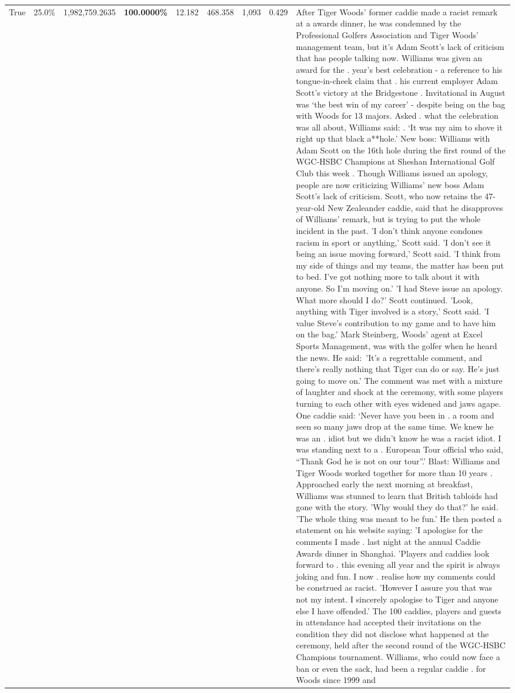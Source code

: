 \begin{table}[H]
\begin{tabular}{lllrlllll}
True & 25.0\% & 1,982,759.2635 & \bfseries \color{red} 100.0000\% & 12.182 & 468.358 & 1,093 & 0.429 & After Tiger Woods' former caddie made a racist remark at a awards dinner, he was condemned by the Professional Golfers Association and Tiger Woods' management team, but it's Adam Scott's lack of criticism that has people talking now. Williams was given an award for the . year’s best celebration - a reference to his tongue-in-cheek claim that . his current employer Adam Scott’s victory at the Bridgestone . Invitational in August was ‘the best win of my career’ - despite being on the bag with Woods for 13 majors. Asked . what the celebration was all about, Williams said: . ‘It was my aim to shove it right up that black a**hole.’ New boss: Williams with Adam Scott  on the 16th hole during the first round of the WGC-HSBC Champions at Sheshan International Golf Club this week . Though Williams issued an apology, people are now criticizing Williams' new boss Adam Scott's lack of criticism. Scott, who now retains the 47-year-old New Zealeander caddie, said that he disapproves of Williams' remark, but is trying to put the whole incident in the past. 'I don't think anyone condones racism in sport or anything,' Scott said. 'I don't see it being an issue moving forward,' Scott said. 'I think from my side of things and my teams, the matter has been put to bed. I've got nothing more to talk about it with anyone. So I'm moving on.' 'I had Steve issue an apology. What more should I do?' Scott continued. 'Look, anything with Tiger involved is a story,' Scott said. 'I value Steve's contribution to my game and to have him on the bag.' Mark Steinberg, Woods' agent at Excel Sports Management, was with the golfer when he heard the news. He said: 'It's a regrettable comment, and there's really nothing that Tiger can do or say. He's just going to move on.' The comment was met with a mixture of laughter and shock at the ceremony, with some players turning to each other with eyes widened and jaws agape. One caddie said: ‘Never have you been in . a room and seen so many jaws drop at the same time. We knew he was an . idiot but we didn’t know he was a racist idiot. I was standing next to a . European Tour official who said, “Thank God he is not on our tour”.’ Blast: Williams and Tiger Woods worked together for more than 10 years . Approached early the next morning at breakfast, Williams was stunned to learn that British tabloids had gone with the story. 'Why would they do that?' he said. 'The whole thing was meant to be fun.' He then posted a statement on his website saying: 'I apologise for the comments I made . last night at the annual Caddie Awards dinner in Shanghai. 'Players and caddies look forward to . this evening all year and the spirit is always joking and fun. I now . realise how my comments could be construed as racist. 'However I assure you that was not my intent. I sincerely apologise to Tiger and anyone else I have offended.' The 100 caddies, players and guests in attendance had accepted their invitations on the condition they did not disclose what happened at the ceremony, held after the second round of the WGC-HSBC Champions tournament. Williams, who could now face a ban or even the sack, had been a regular caddie . for Woods since 1999 and 
\end{tabular}
\end{table}
